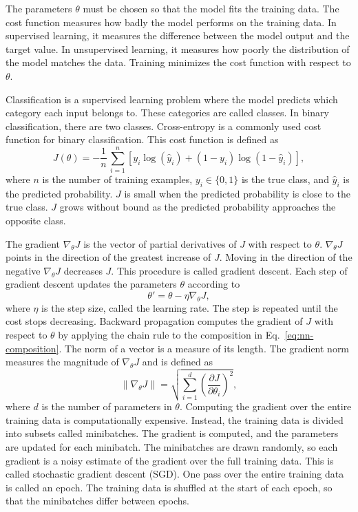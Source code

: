 The parameters $\theta$ must be chosen so that the model fits the training data. The cost function measures how badly the model performs on the training data. In supervised learning, it measures the difference between the model output and the target value. In unsupervised learning, it measures how poorly the distribution of the model matches the data. Training minimizes the cost function with respect to $\theta$. 

Classification is a supervised learning problem where the model predicts which category each input belongs to. These categories are called classes. In binary classification, there are two classes. Cross-entropy is a commonly used cost function for binary classification. This cost function is defined as 
\begin{equation}
   J(\theta) = -\frac{1}{n}\,\sum_{i=1}^{n}[y_i\log(\hat{y}_i) + (1-y_i)\log(1-\hat{y}_i)],
\end{equation}
where $n$ is the number of training examples, $y_i \in \{0,1\}$ is the true class, and $\hat{y}_i$ is the predicted probability. $J$ is small when the predicted probability is close to the true class. $J$ grows without bound as the predicted probability approaches the opposite class.

The gradient $\nabla_{\theta}J$ is the vector of partial derivatives of $J$ with respect to $\theta$. $\nabla_{\theta}J$ points in the direction of the greatest increase of $J$. Moving in the direction of the negative $\nabla_{\theta}J$ decreases $J$. This procedure is called gradient descent. Each step of gradient descent updates the parameters $\theta$ according to
\begin{equation}
\theta' = \theta - \eta \nabla_{\theta}J,
\end{equation}
where $\eta$ is the step size, called the learning rate. The step is repeated until the cost stops decreasing. Backward propagation computes the gradient of $J$ with respect to $\theta$ by applying the chain rule to the composition in Eq.~\eqref{eq:nn-composition}.
The norm of a vector is a measure of its length. The gradient norm measures the magnitude of $\nabla_{\theta}J$ and is defined as
\begin{equation}
\|\nabla_{\theta}J\| = \sqrt{\sum_{i=1}^{d}\left(\frac{\partial J}{\partial \theta_i}\right)^2},
\end{equation}
where $d$ is the number of parameters in $\theta$. Computing the gradient over the entire training data is computationally expensive. Instead, the training data is divided into subsets called minibatches. The gradient is computed, and the parameters are updated for each minibatch. The minibatches are drawn randomly, so each gradient is a noisy estimate of the gradient over the full training data. This is called stochastic gradient descent (SGD). One pass over the entire training data is called an epoch. The training data is shuffled at the start of each epoch, so that the minibatches differ between epochs.

